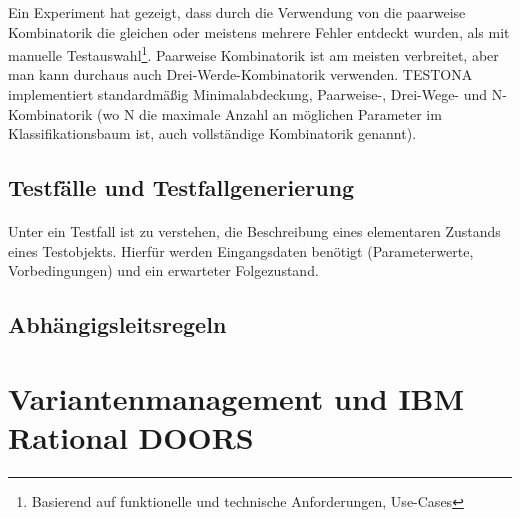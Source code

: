 Ein Experiment hat gezeigt, dass durch die Verwendung von die paarweise Kombinatorik die gleichen oder meistens mehrere Fehler entdeckt wurden, als mit manuelle Testauswahl\footnote{Basierend auf funktionelle und technische Anforderungen, Use-Cases}. Paarweise Kombinatorik ist am meisten verbreitet, aber man kann durchaus auch Drei-Werde-Kombinatorik verwenden. TESTONA implementiert standardmäßig Minimalabdeckung, Paarweise-, Drei-Wege- und N-Kombinatorik (wo N die maximale Anzahl an möglichen Parameter im Klassifikationsbaum ist, auch vollständige Kombinatorik genannt)\cite{CombinatorialSTesting}.\\




\subsection{Testfälle und Testfallgenerierung}
\paragraph{}

Unter ein Testfall ist zu verstehen, die Beschreibung eines elementaren Zustands eines Testobjekts. Hierfür werden Eingangsdaten benötigt (Parameterwerte, Vorbedingungen) und ein erwarteter Folgezustand.

\subsection{Abhängigsleitsregeln}
\paragraph{}





\section{Variantenmanagement und IBM Rational DOORS}\label{DOORS}
\paragraph{}





